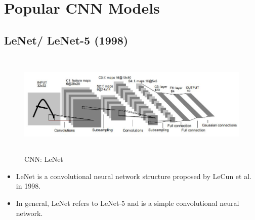 \chapter{Popular CNN Models}

\section{LeNet/ LeNet-5 (1998) \cite{gfg-convolutional-neural-network-cnn-in-machine-learning,wiki-lenet,ieee/726791/cnn-lenet,medium/lenet-5-complete-architecture-84c6d08215f9}}\label{cnn: LeNet}

\begin{figure}[h]
    \centering
    \includegraphics[width=\linewidth, height=5cm, keepaspectratio]{Pictures/convolutional-neural-network/LeNet_Original_Image.jpg}
    \caption{CNN: LeNet}
\end{figure}

\begin{itemize}
    \item LeNet is a convolutional neural network structure proposed by LeCun et al. in 1998. \cite{ieee/726791/cnn-lenet}
    
    
    \item In general, LeNet refers to LeNet-5 and is a simple convolutional neural network.
\end{itemize}


